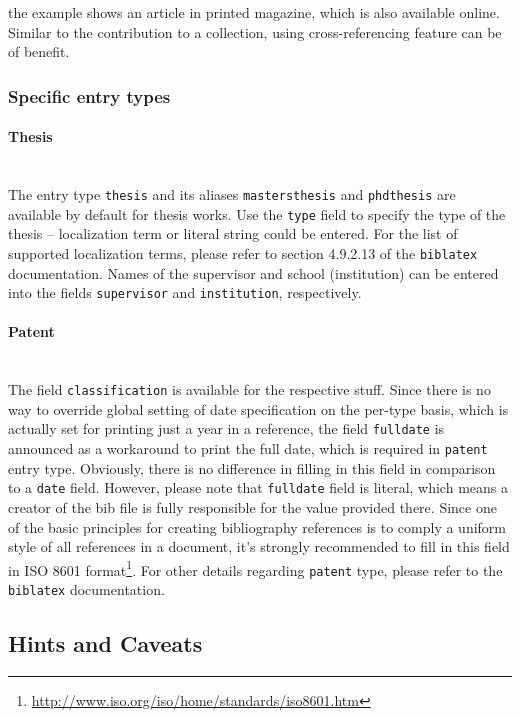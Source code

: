 \documentclass[a4paper,10pt]{ltxdockit}
\def\t|#1|{\texttt{#1}}
\begin{document}
\noindent the example shows an article in printed magazine, which is also
available online. Similar to the contribution to a collection,
using cross-referencing feature can be of benefit.

\subsubsection{Specific entry types}

\paragraph{Thesis}\hfill\\

The entry type \t|thesis| and its aliases \t|mastersthesis| and
\t|phdthesis| are available by default for thesis works. Use the
\t|type| field to specify the type of the thesis -- localization
term or literal string could be entered. For the list of supported
localization terms, please refer to section 4.9.2.13 of the
\t|biblatex| documentation. Names of the supervisor and school
(institution) can be entered into the fields \t|supervisor| and
\t|institution|, respectively.

\paragraph{Patent}\hfill\\

The field \t|classification| is available for the respective stuff.
Since there is no way to override global setting of date specification
on the per-type basis, which is actually set for printing just a year
in a reference, the field \t|fulldate| is announced as a workaround
to print the full date, which is required in \t|patent| entry type.
Obviously, there is no difference in filling in this field in comparison
to a \t|date| field. However, please note that \t|fulldate| field is literal,
which means a creator of the bib file is fully responsible for the value
provided there. Since one of the basic principles for creating bibliography
references is to comply a uniform style of all references in a document,
it's strongly recommended to fill in this field in ISO 8601
format\footnote{\url{http://www.iso.org/iso/home/standards/iso8601.htm}}.
For other details regarding \t|patent| type, please refer
to the \t|biblatex| documentation.

\subsection{Hints and Caveats}
\end{document}
